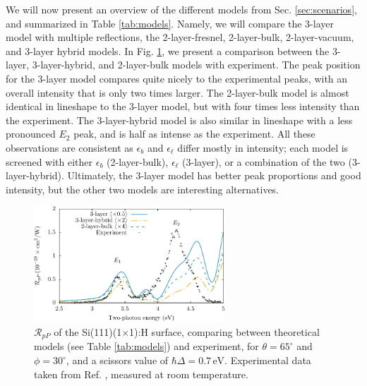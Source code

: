 We will now present an overview of the different models from Sec.
\ref{sec:scenarios}, and summarized in Table \ref{tab:models}. Namely, we will
compare the 3-layer model with multiple reflections, the 2-layer-fresnel,
2-layer-bulk, 2-layer-vacuum, and 3-layer hybrid models. In Fig. \ref{fig:RpP},
we present a comparison between the 3-layer, 3-layer-hybrid, and 2-layer-bulk
models with experiment. The peak position for the 3-layer model compares quite
nicely to the experimental peaks, with an overall intensity that is only two
times larger. The 2-layer-bulk model is almost identical in lineshape to the
3-layer model, but with four times less intensity than the experiment. The
3-layer-hybrid model is also similar in lineshape with a less pronounced $E_{2}$
peak, and is half as intense as the experiment. All these observations are
consistent as $\epsilon_{b}$ and $\epsilon_{\ell}$ differ mostly in intensity;
each model is screened with either $\epsilon_{b}$ (2-layer-bulk),
$\epsilon_{\ell}$ (3-layer), or a combination of the two (3-layer-hybrid).
Ultimately, the 3-layer model has better peak proportions and good intensity,
but the other two models are interesting alternatives.

\begin{figure}[b]
\centering 
\includegraphics[width=0.64\textwidth]{content/figures/fig-Si1x1-Mejia_RpP}
\caption[$\mathcal{R}_{pP}$ compared to experimental data from Mejia et al.]
{$\mathcal{R}_{pP}$ of the Si(111)(1$\times$1):H surface, comparing between
theoretical models (see Table \ref{tab:models}) and experiment, for
$\theta=65^{\circ}$ and $\phi=30^{\circ}$, and a scissors value of $\hbar\Delta
= 0.7\,\text{eV}$. Experimental data taken from Ref.
\cite{mejiaPRB02}, measured at room temperature.}
\label{fig:RpP}
\end{figure}

